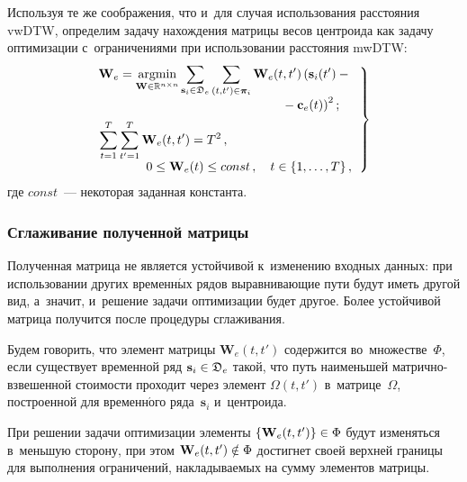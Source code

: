 \begin{multicols}{2}
Используя те же соображения, что и~для 
случая использования расстояния vwDTW, определим задачу нахождения матрицы весов 
центроида как задачу оптимизации с~ограничениями при использовании расстояния mwDTW:
\begin{equation}
\left.
\begin{array}{c}
 \!\!\!\!\!\mathbf{W}_e = \mathop{\mathrm{argmin}}\limits_{{\mathbf{W} \in \mathbb{R}^{n \times n}}}
\displaystyle \sum\limits_{\mathbf{s}_i \in \fD_e}
 \sum\limits_{(t,t') \in \boldsymbol{\pi}_i}\mathbf{W}_e(t,t')
 \left(\mathbf{s}_i(t')-{}\right.\\[6pt]
 \!\!\!\!\! \left.\hspace*{47mm}{}-\mathbf{c}_e(t)\right)^2;
\\[6pt]
 \!\!\!\!\!\hspace*{-35mm}\displaystyle\sum\limits_{t=1}^T\sum\limits_{t'=1}^T{\mathbf{W}_e(t,t')} = T^2\,, \\[6pt] 
\hspace*{10mm}0 \leq \mathbf{W}_e(t) \leq const\,, \quad t \in \{1,\ldots,T\}\,,
\end{array}
\right\}\!\!
 \label{e15-g}
\end{equation}
где $const$~--- некоторая заданная константа.

\vspace*{-6pt}

\subsubsection{Сглаживание полученной матрицы}

Полученная матрица не является устойчивой к~изменению входных данных: 
при использовании других временн$\acute{\mbox{ы}}$х рядов выравнивающие пути будут иметь другой вид, 
а~значит, и~решение задачи оптимизации будет другое. Более устойчивой мат\-ри\-ца 
получится после процедуры сглажи\-вания.
{

}

Будем говорить, что элемент матрицы $\mathbf{W}_e(t,t')$ содержится 
во~множестве~$\Phi$, 
если существует временной ряд $\mathbf{s}_i \hm\in \fD_e$ такой, что путь 
наименьшей мат\-рич\-но-взве\-шен\-ной стоимости проходит через 
элемент $\Omega(t,t')$ 
в~матрице~$\Omega$, построенной для временн$\acute{\mbox{о}}$го ряда~$\mathbf{s}_i$ и~центроида.

При решении задачи оптимизации элементы $\{\mathbf{W}_e(t,t')\} \hm\in \Phi$
будут изменяться в~меньшую сторону, при этом 
$\mathbf{W}_e(t,t') \hm\notin \Phi$ достигнет своей верхней границы для 
выполнения ограничений, накладываемых на сумму элементов матрицы.


\end{multicols}
